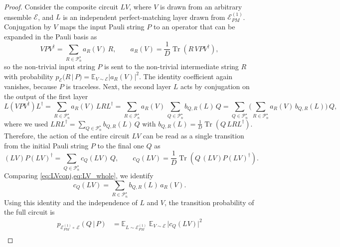 \documentclass[
    aps,
    superscriptaddress,
    onecolumn,
    10pt,
    prx,
    nofootinbib
]{revtex4-2}
\theoremstyle{namedstatement}
\theoremstyle{plain}
\begin{document}
\begin{proof}
Consider the composite circuit $LV$, where $V$ is drawn from an
arbitrary ensemble $\mathcal{E}$, and $L$ is an independent perfect-matching layer drawn from $\mathcal{E}_{PM}^{(1)}$. Conjugation by $V$ maps the input Pauli string $P$ to an operator that can be expanded in the Pauli basis as
\begin{equation}
\label{eq:Vconj}
    V P V^{\dagger} = \sum_{R \in \mathcal{P}_n^\star} a_R(V)\, R,
    \qquad
    a_R(V) = \frac{1}{D}\operatorname{Tr}\!\left(R\, V P V^{\dagger}\right),
\end{equation}
so the non-trivial input string $P$ is sent to the non-trivial intermediate string $R$ with probability $p_{\mathcal{E}}(R \,|\, P) = \mathbb{E}_{V \sim \mathcal{E}} |a_R(V)|^2$. The identity coefficient again vanishes, because $P$ is traceless. Next, the second layer $L$ acts by conjugation on the output of the first layer
\begin{equation}
\label{eq:LVconj}
    L\left(V P V^{\dagger}\right) L^{\dagger}
    = \sum_{R \in \mathcal{P}_n^\star} a_R(V)\, L R L^{\dagger}= \sum_{R \in \mathcal{P}_n^\star} a_R(V)\, \sum_{Q \in \mathcal{P}_n^\star} b_{Q,R}(L)\, Q = \sum_{Q \in \mathcal{P}_n^\star} \bigg ( \sum_{R \in \mathcal{P}_n^\star} a_R(V)\,  b_{Q,R}(L) \bigg )\, Q,
\end{equation}
where we used $L R L^{\dagger} = \sum_{Q \in \mathcal{P}_n^\star} b_{Q,R}(L)\, Q$ with $b_{Q,R}(L) = \frac{1}{D}\operatorname{Tr}\!\left(Q\, L R L^{\dagger}\right)$. Therefore, the action of the entire circuit $LV$ can be read as a single transition from the initial Pauli string $P$ to the final one $Q$ as
\begin{equation}
\label{eq:LV_whole}
    (LV)P(LV)^{\dagger}= \sum_{Q \in \mathcal{P}_n^\star} c_Q(LV)\, Q,
    \qquad
    c_Q(LV) = \frac{1}{D}\operatorname{Tr}\!\left(Q\, (LV) P (LV)^{\dagger}\right).
\end{equation}
Comparing \cref{eq:LVconj,eq:LV_whole}, we identify
\begin{equation}
    c_Q(LV) = \sum_{R \in \mathcal{P}_n^\star} b_{Q,R}(L)\, a_R(V).
\end{equation}
Using this identity and the independence of $L$ and $V$, the transition probability of the full circuit is
\begin{align}
\label{eq:R_terms_decomposition}
    p_{\mathcal{E}_{PM}^{(1)}\circ \;\mathcal{E}}(Q \,|\, P)
    &= \mathbb{E}_{L \sim \mathcal{E}_{PM}^{(1)}}\;\mathbb{E}_{V \sim \mathcal{E}}\, \big| c_Q(LV) \big|^2 \nonumber \\

\end{align}
\end{proof}
\end{document}
